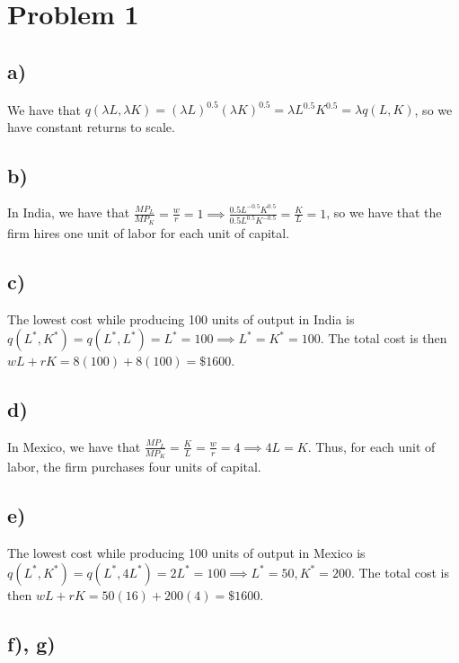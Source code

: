 \documentclass[12pt,letterpaper]{article}
\theoremstyle{definition}
\begin{document}
\section*{Problem 1}

\subsection*{a)}

We have that $q(\lambda L,\lambda K) = (\lambda L)^{0.5}(\lambda K)^{0.5} =
\lambda L^{0.5}K^{0.5} = \lambda q(L,K)$, so we have constant returns to scale.

\subsection*{b)}

In India, we have that $\frac{MP_L}{MP_K} = \frac{w}{r} = 1 \implies
\frac{0.5L^{-0.5}K^{0.5}}{0.5L^{0.5}K^{-0.5}} = \frac{K}{L} = 1$, so we have that
the firm hires one unit of labor for each unit of capital.

\subsection*{c)}

The lowest cost while producing 100 units of output in India is $q(L^*,K^*) =
q(L^*,L^*) = L^* = 100 \implies L^* = K^* = 100$. The total cost is then $wL + rK =
8(100) + 8(100)=  \$1600$.

\subsection*{d)}

In Mexico, we have that $\frac{MP_L}{MP_K} = \frac{K}{L} = \frac{w}{r} = 4
\implies 4L = K$. Thus, for each unit of labor, the firm purchases four units of capital.

\subsection*{e)}

The lowest cost while producing 100 units of output in Mexico is $q(L^*,K^*) =
q(L^*,4L^*) = 2L^* = 100 \implies L^* = 50, K^* = 200$. The total cost is then
$wL + rK = 50(16) + 200(4) = \$1600$.

\subsection*{f), g)}
\end{document}
